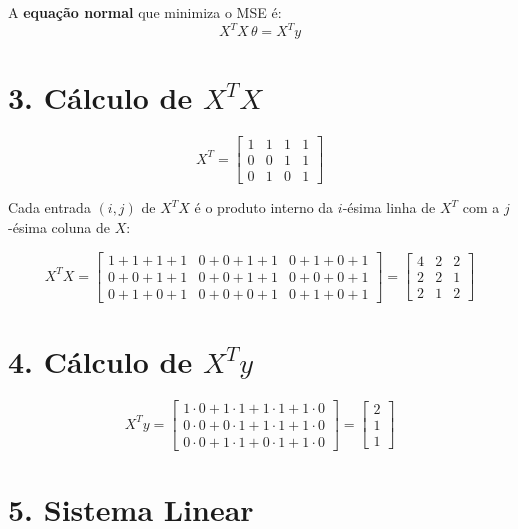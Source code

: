 \documentclass[12pt, a4paper]{article}
\begin{document}
\noindent A \textbf{equação normal} que minimiza o MSE é:
\[
  X^T X\, \theta = X^T y
\]

\section*{3. Cálculo de $X^T X$}

\[
  X^T = \begin{bmatrix}
    1 & 1 & 1 & 1 \\
    0 & 0 & 1 & 1 \\
    0 & 1 & 0 & 1
  \end{bmatrix}
\]

Cada entrada $(i,j)$ de $X^T X$ é o produto interno da $i$-ésima linha de $X^T$ com a $j$-ésima coluna de $X$:

\[
  X^T X =
  \begin{bmatrix}
    1{+}1{+}1{+}1 & 0{+}0{+}1{+}1 & 0{+}1{+}0{+}1 \\
    0{+}0{+}1{+}1 & 0{+}0{+}1{+}1 & 0{+}0{+}0{+}1 \\
    0{+}1{+}0{+}1 & 0{+}0{+}0{+}1 & 0{+}1{+}0{+}1
  \end{bmatrix}
  =
  \begin{bmatrix}
    4 & 2 & 2 \\
    2 & 2 & 1 \\
    2 & 1 & 2
  \end{bmatrix}
\]

\section*{4. Cálculo de $X^T y$}

\[
  X^T y =
  \begin{bmatrix}
    1{\cdot}0 + 1{\cdot}1 + 1{\cdot}1 + 1{\cdot}0 \\
    0{\cdot}0 + 0{\cdot}1 + 1{\cdot}1 + 1{\cdot}0 \\
    0{\cdot}0 + 1{\cdot}1 + 0{\cdot}1 + 1{\cdot}0
  \end{bmatrix}
  =
  \begin{bmatrix} 2 \\ 1 \\ 1 \end{bmatrix}
\]

\section*{5. Sistema Linear}
\end{document}
